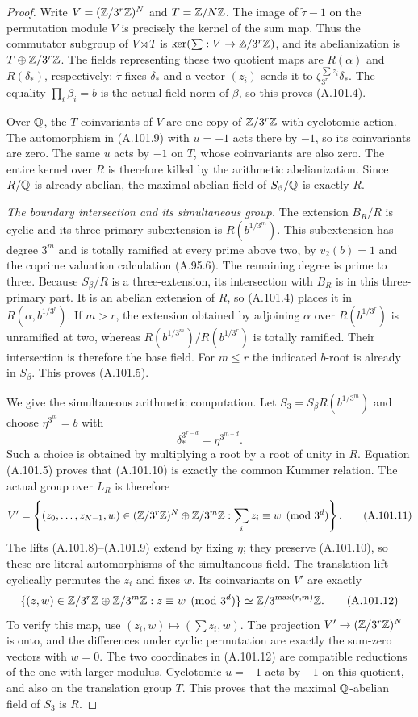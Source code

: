 \begin{proof}
Write $V=(\mathbb Z/3^r\mathbb Z)^N$ and $T=\mathbb Z/N\mathbb Z$.
The image of $\widetilde\tau-1$ on the permutation
module $V$ is precisely the kernel of the sum map.
Thus the commutator subgroup of $V\rtimes T$ is
$\ker(\sum:V\to\mathbb Z/3^r\mathbb Z)$, and its abelianization
is $T\oplus\mathbb Z/3^r\mathbb Z$.
The fields representing these two quotient maps are
$R(\alpha)$ and $R(\delta_*)$, respectively:
$\widetilde\tau$ fixes $\delta_*$ and a vector $(z_i)$
sends it to $\zeta_{3^r}^{\sum z_i}\delta_*$.
The equality $\prod_i\beta_i=b$ is the actual field
norm of $\beta$, so this proves (A.101.4).

Over $\mathbb Q$, the $T$-coinvariants of $V$ are one copy
of $\mathbb Z/3^r\mathbb Z$ with cyclotomic action.
The automorphism in (A.101.9) with $u=-1$ acts there
by $-1$, so its coinvariants are zero.
The same $u$ acts by $-1$ on $T$, whose coinvariants
are also zero.
The entire kernel over $R$ is therefore killed by
the arithmetic abelianization.
Since $R/\mathbb Q$ is already abelian, the maximal abelian
field of $S_\beta/\mathbb Q$ is exactly $R$.

\emph{The boundary intersection and its simultaneous group.}
The extension $B_R/R$ is cyclic and its three-primary
subextension is $R(b^{1/3^m})$.
This subextension has degree $3^m$ and is totally
ramified at every prime above two, by $v_2(b)=1$
and the coprime valuation calculation (A.95.6).
The remaining degree is prime to three.
Because $S_\beta/R$ is a three-extension, its intersection
with $B_R$ is in this three-primary part.
It is an abelian extension of $R$, so (A.101.4)
places it in $R(\alpha,b^{1/3^r})$.
If $m>r$, the extension obtained by adjoining $\alpha$
over $R(b^{1/3^r})$ is unramified at two, whereas
$R(b^{1/3^m})/R(b^{1/3^r})$ is totally ramified.
Their intersection is therefore the base field.
For $m\le r$ the indicated $b$-root is already in
$S_\beta$.  This proves (A.101.5).

We give the simultaneous arithmetic computation.
Let $S_3=S_\beta R(b^{1/3^m})$ and choose
$\eta^{3^m}=b$ with
\[
              \delta_*^{3^{r-d}}=\eta^{3^{m-d}}.
 \tag{A.101.10}
\]
Such a choice is obtained by multiplying a root by
a root of unity in $R$.
Equation (A.101.5) proves that (A.101.10) is exactly
the common Kummer relation.
The actual group over $L_R$ is therefore
\[
 V'=\left\{(z_0,\ldots,z_{N-1},w)
        \in(\mathbb Z/3^r\mathbb Z)^N\oplus\mathbb Z/3^m\mathbb Z:
            \sum_i z_i\equiv w\pmod{3^d}\right\}.
 \tag{A.101.11}
\]
The lifts (A.101.8)--(A.101.9) extend by fixing
$\eta$; they preserve (A.101.10), so these are
literal automorphisms of the simultaneous field.
The translation lift cyclically permutes the $z_i$
and fixes $w$.
Its coinvariants on $V'$ are exactly
\[
 \{(z,w)\in\mathbb Z/3^r\mathbb Z\oplus\mathbb Z/3^m\mathbb Z:
                           z\equiv w\pmod{3^d}\}
                       \simeq\mathbb Z/3^{\max(r,m)}\mathbb Z.
 \tag{A.101.12}
\]
To verify this map, use $(z_i,w)\mapsto(\sum z_i,w)$.
The projection $V'\to(\mathbb Z/3^r\mathbb Z)^N$ is onto, and
the differences under cyclic permutation are exactly
the sum-zero vectors with $w=0$.
The two coordinates in (A.101.12) are compatible
reductions of the one with larger modulus.
Cyclotomic $u=-1$ acts by $-1$ on this quotient,
and also on the translation group $T$.
This proves that the maximal $\mathbb Q$-abelian field
of $S_3$ is $R$.


\end{proof}

